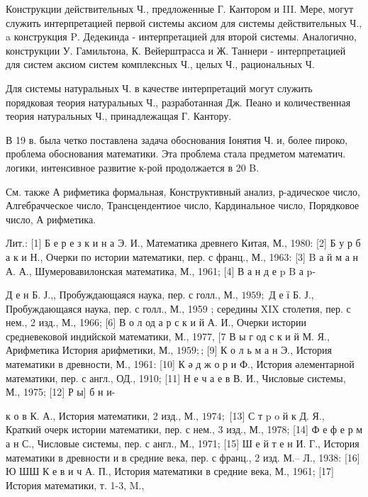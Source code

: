 \documentclass[10pt]{article}
\begin{document}
Конструкции действительных Ч., предложенные $Г$. Кантором и III. Мере, могут служить интерпретацией первой системы аксиом для системы действительных Ч., a конструкция $\mathrm{P}$. Дедекинда - интерпретацией для второй системы. Аналогично, конструкции У. Гамильтона, К. Вейерштрасса и Ж. Таннери - интерпретацией для систем аксиом систем комплексных Ч., целых Ч., рациональных Ч.



Для системы натуральных Ч. в качестве интерпретаций могут служить порядковая теория натуральных Ч., разработанная Дж. Пеано и количественная теория натуральных Ч., принадлежащая Г. Кантору.



В 19 в. была четко поставлена задача обоснования Іонятия Ч. и, более пироко, проблема обоснования математики. Эта проблема стала предметом математич. логики, интенсивное развитие к-рой продолжается в 20 B.



См. также А рифметика формальная, Конструктивный анализ, р-адическое число, Алгебрачческое число, Трансцендентиое число, Кардинальное число, Порядковое число, А рифметика.



Лит.: [1] Б е р е з к и н а Э. И., Математика древнего Китая, М., 1980: [2] Б у р б а к и Н., Очерки по истории математики, пер. с франц., М., 1963: [3] B а й м а н А. А., Шумеровавилонская математика, М., 1961; [4] В а н д е p $\mathrm{B}$ а p-

Д е н Б. Ј.,, Пробуждающаяся наука, пер. с голл., М., $1959 ;$ Д е ї Б. Ј., Пробуждающаяся наука, пер. с голл., М., 1959 ; середины XIX столетия, пер. с нем., 2 изд., М., 1966; [6] В о л од а р с к и й А. И., Очерки истории средневековой индийской математики, М., 1977, [7 В ы г од с к и й М. Я., Арифметика История арифметики, М., $1959 ;$; [9] К о л ь м а н Э., История математики в древности, М., 1961: [10] К ә д ж о р и Ф., История әлементарной математики, пер. с англ., ОД., 1910; [11] Н е ч а е в В. И., Числовые системы, М., 1975; [12] Р ы] б н и-

к о в К. А., История математики, 2 изд., М., $1974 ;$ [13] С т p o й к Д. Я., Краткий очерк истории математики, пер. с нем., 3 изд., М., 1978; [14] Ф е ф е р м а н С., Числовые системы, пер. с англ., М., 1971; [15] Ш е й т е н И. Г., История математики в древности и в средние века, пер. с франц., 2 изд. М.-- Л., 1938: [16] Ю ШШ К е в и ч А. П., История математики в средние века, М., 1961; [17] История математики, т. 1-3, M.,
\end{document}
